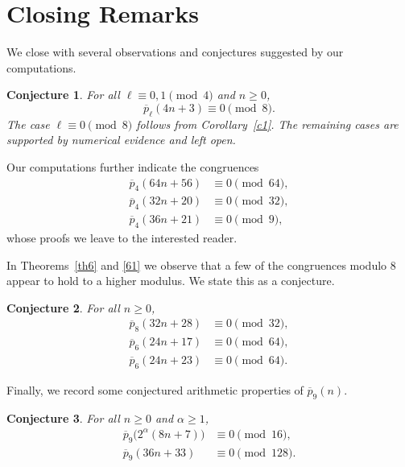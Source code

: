 \documentclass[11pt, reqno]{amsart}
\newtheorem{conjecture}{Conjecture}
\numberwithin{equation}{section}
\begin{document}
	\section{Closing Remarks}
	We close with several observations and conjectures suggested by our
	computations.
	
	\begin{conjecture}
		For all $\ell\equiv0,1\pmod4$ and $n\ge0$,
		\[
		\overline{p}_{\ell}(4n+3)\equiv0\pmod8.
		\]
		The case $\ell\equiv0\pmod8$ follows from Corollary~\ref{c1}. The remaining
		cases are supported by numerical evidence and left open. 
	\end{conjecture}
	
	\noindent Our computations further indicate the congruences
	\begin{align}
		\overline{p}_{4}(64n+56)&\equiv0\pmod{64},\\
		\overline{p}_{4}(32n+20)&\equiv0\pmod{32},\\
		\overline{p}_{4}(36n+21)&\equiv0\pmod{9},
	\end{align}
	whose proofs we leave to the interested reader.
	
	\noindent In Theorems~\ref{th6} and \ref{61} we observe that a few of the congruences
	modulo $8$ appear to hold to a higher modulus. We state this as a conjecture.
	\begin{conjecture}
		For all $n\ge0$,
		\begin{align}
			\overline{p}_{8}(32n+28)&\equiv0\pmod{32},\\
			\overline{p}_{6}(24n+17)&\equiv0\pmod{64},\\
			\overline{p}_{6}(24n+23)&\equiv0\pmod{64}.
		\end{align}
	\end{conjecture}
	
	\noindent Finally, we record some conjectured arithmetic properties of
	$\overline{p}_{9}(n)$.
	\begin{conjecture}
		For all $n\ge0$ and $\alpha\ge1$,
		\begin{align}
			\overline{p}_{9}\bigl(2^{\alpha}(8n+7)\bigr)&\equiv0\pmod{16},\\
			\overline{p}_{9}(36n+33)&\equiv0\pmod{128}.
		\end{align}
	\end{conjecture}
	
\end{document}
